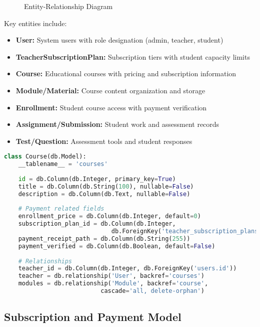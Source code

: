 \begin{figure}[h]
\centering
\caption{Entity-Relationship Diagram}
\label{fig:erd}
\end{figure}

Key entities include:

\begin{itemize}
    \item \textbf{User:} System users with role designation (admin, teacher, student)
    \item \textbf{TeacherSubscriptionPlan:} Subscription tiers with student capacity limits
    \item \textbf{Course:} Educational courses with pricing and subscription information
    \item \textbf{Module/Material:} Course content organization and storage
    \item \textbf{Enrollment:} Student course access with payment verification
    \item \textbf{Assignment/Submission:} Student work and assessment records
    \item \textbf{Test/Question:} Assessment tools and student responses
\end{itemize}

\begin{lstlisting}[language=Python, caption=Course Model Example, label=lst:course-model]
class Course(db.Model):
    __tablename__ = 'courses'
    
    id = db.Column(db.Integer, primary_key=True)
    title = db.Column(db.String(100), nullable=False)
    description = db.Column(db.Text, nullable=False)
    
    # Payment related fields
    enrollment_price = db.Column(db.Integer, default=0)
    subscription_plan_id = db.Column(db.Integer, 
                              db.ForeignKey('teacher_subscription_plans.id'))
    payment_receipt_path = db.Column(db.String(255))
    payment_verified = db.Column(db.Boolean, default=False)
    
    # Relationships
    teacher_id = db.Column(db.Integer, db.ForeignKey('users.id'))
    teacher = db.relationship('User', backref='courses')
    modules = db.relationship('Module', backref='course',
                           cascade='all, delete-orphan')
\end{lstlisting}

\subsection{Subscription and Payment Model}

